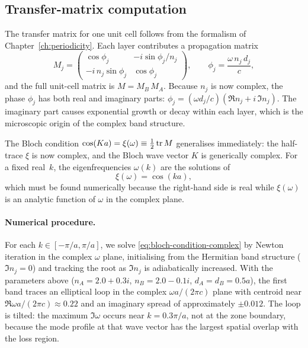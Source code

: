 \subsection{Transfer-matrix computation}
\label{ssec:bilayer-transfer}

The transfer matrix for one unit cell follows from the formalism of
Chapter~\ref{ch:periodicity}. Each layer contributes a propagation
matrix
\begin{equation}
 M_j = \begin{pmatrix}
 \cos\phi_j & -i\sin\phi_j/n_j \\
 -i\,n_j\sin\phi_j & \cos\phi_j
 \end{pmatrix},
 \qquad
 \phi_j = \frac{\omega\,n_j\,d_j}{c},
 \label{eq:complex-single-layer}
\end{equation}
and the full unit-cell matrix is $M = M_B\,M_A$. Because $n_j$ is now
complex, the phase $\phi_j$ has both real and imaginary parts:
$\phi_j = (\omega d_j/c)(\Re n_j + i\,\Im n_j)$. The imaginary part
causes exponential growth or decay within each layer, which is the
microscopic origin of the complex band structure.

The Bloch condition $\cos(Ka) = \xi(\omega) \equiv \tfrac{1}{2}\operatorname{tr} M$
generalises immediately: the half-trace $\xi$ is now complex, and the
Bloch wave vector $K$ is generically complex. For a fixed real~$k$,
the eigenfrequencies $\omega(k)$ are the solutions of
\begin{equation}
 \xi(\omega) = \cos(ka),
 \label{eq:bloch-condition-complex}
\end{equation}
which must be found numerically because the right-hand side is real
while $\xi(\omega)$ is an analytic function of $\omega$ in the complex
plane.

\paragraph{Numerical procedure.}
For each $k \in [-\pi/a, \pi/a]$, we solve
\eqref{eq:bloch-condition-complex} by Newton iteration in the complex
$\omega$ plane, initialising from the Hermitian band structure
($\Im n_j = 0$) and tracking the root as $\Im n_j$ is adiabatically
increased. With the parameters above ($n_A = 2.0 + 0.3i$,
$n_B = 2.0 - 0.1i$, $d_A = d_B = 0.5a$), the first band traces an
elliptical loop in the complex $\omega a/(2\pi c)$ plane with
centroid near $\Re\omega a/(2\pi c) \approx 0.22$ and an imaginary
spread of approximately $\pm 0.012$. The loop is tilted: the maximum
$\Im\omega$ occurs near $k = 0.3\pi/a$, not at the zone boundary,
because the mode profile at that wave vector has the largest spatial
overlap with the loss region.

